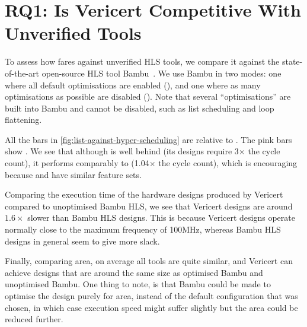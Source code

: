 
\section{RQ1: Is Vericert Competitive With Unverified Tools}

To assess how \VericertHyper{} fares against unverified HLS tools, we compare it
against the state-of-the-art open-source HLS tool
Bambu~\cite[]{ferrandi21_bambu}. We use Bambu in two modes: one where all
default optimisations are enabled (\BambuDefault{}), and one where as many
optimisations as possible are disabled (\BambuNoOpt{}). Note that several
\enquote{optimisations} are built into Bambu and cannot be disabled, such as
list scheduling and loop flattening.

All the bars in \cref{fig:list-against-hyper-scheduling} are relative to
\BambuDefault. The pink bars show \BambuNoOpt. We see that although
\VericertHyper{} is well behind \BambuDefault{} (its designs require 3$\times$
the cycle count), it performs comparably to \BambuNoOpt{} (1.04$\times$ the
cycle count), which is encouraging because \VericertHyper{} and \BambuNoOpt{}
have similar feature sets.

Comparing the execution time of the hardware designs produced by Vericert
compared to unoptimised Bambu HLS, we see that Vericert designs are around
$1.6\times$ slower than Bambu HLS designs.  This is because Vericert designs
operate normally close to the maximum frequency of 100MHz, whereas Bambu HLS
designs in general seem to give more slack.

Finally, comparing area, on average all tools are quite similar, and Vericert
can achieve designs that are around the same size as optimised Bambu and
unoptimised Bambu.  One thing to note, is that Bambu could be made to optimise
the design purely for area, instead of the default configuration that was
chosen, in which case execution speed might suffer slightly but the area could
be reduced further.

